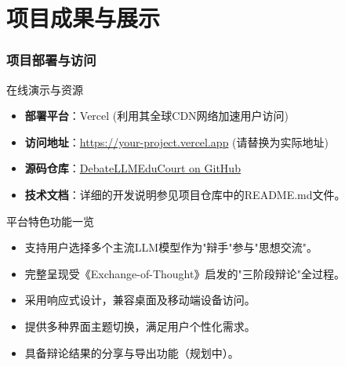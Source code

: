 \documentclass[aspectratio=169]{beamer} %
\newcommand{\hrefcol}[2]{\textcolor{cyan}{\href{#1}{#2}}}
\begin{document}
\section{项目成果与展示}

\begin{frame}
\frametitle{项目部署与访问}
\begin{block}{在线演示与资源}
\begin{itemize}
\item \textbf{部署平台}：Vercel (利用其全球CDN网络加速用户访问)
\item \textbf{访问地址}：\hrefcol{https://your-project.vercel.app}{https://your-project.vercel.app} (请替换为实际地址)
\item \textbf{源码仓库}：\hrefcol{https://github.com/Summerlemon233/DebateLLMEduCourt}{DebateLLMEduCourt on GitHub}
\item \textbf{技术文档}：详细的开发说明参见项目仓库中的README.md文件。
\end{itemize}
\end{block}

\begin{block}{平台特色功能一览}
\begin{itemize}
\item 支持用户选择多个主流LLM模型作为"辩手"参与"思想交流"。
\item 完整呈现受《Exchange-of-Thought》启发的"三阶段辩论"全过程。
\item 采用响应式设计，兼容桌面及移动端设备访问。
\item 提供多种界面主题切换，满足用户个性化需求。
\item 具备辩论结果的分享与导出功能（规划中）。
\end{itemize}
\end{block}
\end{frame}
\end{document}
